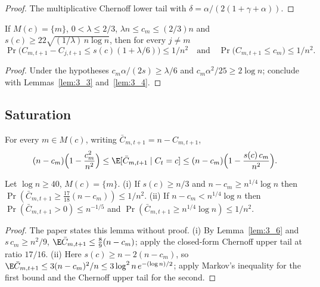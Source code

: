 \begin{proof}
  The multiplicative Chernoff lower tail with
  $\delta = \alpha/(2(1 + \gamma + \alpha))$.
\end{proof}

\begin{lemma}\label{lem:3_5}
  \leanok
  If $M(c) = \{m\}$, $0 < \lambda \le 2/3$, $\lambda n \le c_m \le (2/3)n$
  and $s(c) \ge 22\sqrt{(1/\lambda)\,n\log n}$, then for every $j \ne m$
  \[
    \Pr\bigl(C_{m,t+1} - C_{j,t+1} \le s(c)(1 + \lambda/6)\bigr) \le 1/n^2
    \quad\text{and}\quad
    \Pr\bigl(C_{m,t+1} \le c_m\bigr) \le 1/n^2.
  \]
\end{lemma}

\begin{proof}
  Under the hypotheses $c_m\alpha/(2s) \ge \lambda/6$ and
  $c_m\alpha^2/25 \ge 2\log n$; conclude with Lemmas~\ref{lem:3_3}
  and~\ref{lem:3_4}.
\end{proof}

\subsection{Saturation}

\begin{lemma}[Lemma 3.6]\label{lem:3_6}
  \leanok
  For every $m \in M(c)$, writing $\bar C_{m,t+1} = n - C_{m,t+1}$,
  \[
    (n - c_m)\Bigl(1 - \frac{c_m^2}{n^2}\Bigr)
      \le \E[\bar C_{m,t+1} \mid C_t = c]
      \le (n - c_m)\Bigl(1 - \frac{s(c)\,c_m}{n^2}\Bigr).
  \]
\end{lemma}

\begin{lemma}\label{lem:3_7}
  \leanok
  Let $\log n \ge 40$, $M(c) = \{m\}$.
  (i) If $s(c) \ge n/3$ and $n - c_m \ge n^{1/4}\log n$ then
  $\Pr(\bar C_{m,t+1} \ge \frac{17}{18}(n - c_m)) \le 1/n^2$.
  (ii) If $n - c_m < n^{1/4}\log n$ then $\Pr(\bar C_{m,t+1} > 0) \le n^{-1/5}$
  and $\Pr(\bar C_{m,t+1} \ge n^{1/4}\log n) \le 1/n^2$.
\end{lemma}

\begin{proof}
  The paper states this lemma without proof. (i) By Lemma~\ref{lem:3_6} and
  $s\,c_m \ge n^2/9$, $\E\bar C_{m,t+1} \le \frac89(n - c_m)$; apply the
  closed-form Chernoff upper tail at ratio $17/16$. (ii) Here
  $s(c) \ge n - 2(n - c_m)$, so $\E\bar C_{m,t+1} \le 3(n-c_m)^2/n
  \le 3\log^2 n\, e^{-(\log n)/2}$; apply Markov's inequality for the first
  bound and the Chernoff upper tail for the second.
\end{proof}

